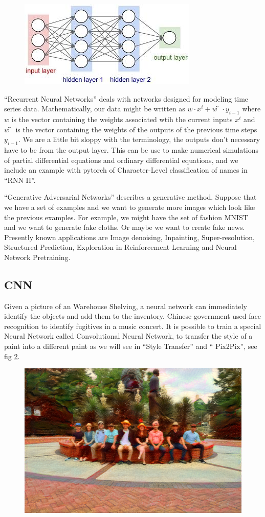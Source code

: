 \documentclass[11pt,letterpaper]{report}
\begin{document}
    	\begin{figure}[h!]
    	\centering
    	\includegraphics[width=0.45\linewidth]{figures/nn.jpg}
    	\caption{}
    	\label{fig:nn}
    \end{figure} 	

    ``Recurrent Neural Networks'' deals with networks designed for modeling time series data.  Mathematically, our data might be written as $w⋅x^i+w̃ ⋅y_{i−1}$ where  $w$  is the vector containing the weights associated wtih the current inputs  $x^i$  and  $w̃$  is the vector containing the weights of the outputs of the previous time steps  $y_{i−1}$. We are a little bit sloppy with the terminology, the outputs don't necessary have to be from the output layer.
This can be use to make numerical simulations of partial differential equations and ordinary differential equations, and we include an example with pytorch of Character-Level classification of names in ``RNN II''.

    ``Generative Adversarial Networks'' describes a generative method. Suppose that we have a set of examples and we want to generate more images which look like the previous examples. For example, we might have the set of fashion MNIST and we want to generate fake cloths. Or maybe we want to create fake news. Presently known applications are Image denoising, Inpainting, Super-resolution, Structured Prediction, Exploration in Reinforcement Learning and Neural Network Pretraining.

	\subsection{CNN}
	
	Given a picture of an Warehouse Shelving, a  neural network can immediately identify the objects and add them to the inventory. Chinese government used face recognition to identify fugitives in a music concert. It is possible to train a special Neural Network called Convolutional Neural Network, to transfer the style of a paint into a different paint as we will see in ``Style Transfer'' and `` Pix2Pix'', see fig \ref{fig:botero}. 
	
	
	\begin{figure}[h!]
		\centering
		\includegraphics[width=0.45\linewidth]{figures/botero.png}
		\caption{}
		\label{fig:botero}
	\end{figure} 	
	
\end{document}
